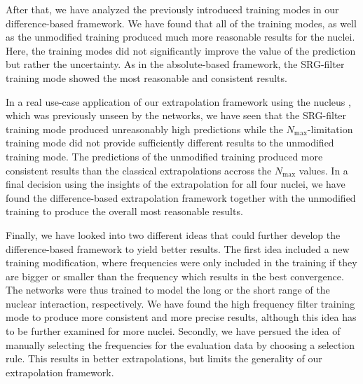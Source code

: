 After that, we have analyzed the previously introduced training modes in our difference-based framework. We have found that all of the training modes, as well as the unmodified training produced much more reasonable results for the nuclei. Here, the training modes did not significantly improve the value of the prediction but rather the uncertainty. As in the absolute-based framework, the SRG-filter training mode showed the most reasonable and consistent results.

In a real use-case application of our extrapolation framework using the nucleus , which was previously unseen by the networks, we have seen that the SRG-filter training mode produced unreasonably high predictions while the $N_\mathrm{max}$-limitation training mode did not provide sufficiently different results to the unmodified training mode. The predictions of the unmodified training produced more consistent results than the classical extrapolations accross the $N_\mathrm{max}$ values. In a final decision using the insights of the extrapolation for all four nuclei, we have found the difference-based extrapolation framework together with the unmodified training to produce the overall most reasonable results.

Finally, we have looked into two different ideas that could further develop the difference-based framework to yield better results. The first idea included a new training modification, where frequencies were only included in the training if they are bigger or smaller than the frequency which results in the best convergence. The networks were thus trained to model the long or the short range of the nuclear interaction, respectively. We have found the high frequency filter training mode to produce more consistent and more precise results, although this idea has to be further examined for more nuclei. Secondly, we have persued the idea of manually selecting the frequencies for the evaluation data by choosing a selection rule. This results in better extrapolations, but limits the generality of our extrapolation framework.
